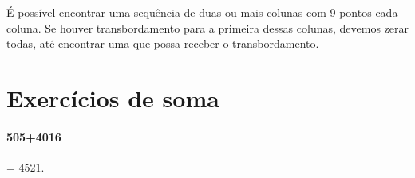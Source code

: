 \documentclass[12pt]{book}
\begin{document}
\vspace{0.2cm}
É possível encontrar uma sequência de duas ou mais
colunas com 9 pontos cada coluna. Se houver transbordamento para
a primeira dessas colunas, devemos zerar todas,
até encontrar uma que possa receber o transbordamento.

\vspace{0.2cm}
\begin{minipage}{0.4\textwidth}
\end{minipage}%
%
\begin{minipage}{0.5\textwidth}
\end{minipage}


\section{Exercícios de soma}

\paragraph{505+4016}= 4521.\\
\end{document}

